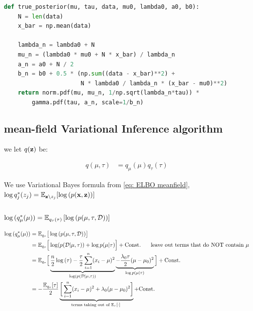 \documentclass{article}
\def\C{\text{Const.}}
\begin{document}
\begin{lstlisting}[language=Python]
def true_posterior(mu, tau, data, mu0, lambda0, a0, b0):
    N = len(data)
    x_bar = np.mean(data)
    
    lambda_n = lambda0 + N
    mu_n = (lambda0 * mu0 + N * x_bar) / lambda_n
    a_n = a0 + N / 2
    b_n = b0 + 0.5 * (np.sum((data - x_bar)**2) + 
                      N * lambda0 / lambda_n * (x_bar - mu0)**2)
    return norm.pdf(mu, mu_n, 1/np.sqrt(lambda_n*tau)) * 
		gamma.pdf(tau, a_n, scale=1/b_n)
\end{lstlisting}



\subsection{mean-field Variational Inference algorithm}

we let $q({\mathbf z})$ be:

\begin{equation}\begin{split}
q (\mu, \tau) &= q_{\mu} (\mu) q_{\tau}(\tau)
\end{split}\end{equation}

We use Variational Bayes formula from \ref{eq: ELBO meanfield}, $\log q_j^*(z_j) = \mathbb{E}_{{\mathbf z} \setminus z_j} [ \log{(p({\mathbf x},{\mathbf z}))} ]$

\subsubsection{$\log{ ( q_\mu^*(\mu)) } = \mathbb{E}_{q_\tau(\tau)}  \left[ \log{(p(\mu, \tau , \mathcal{D}))} \right]$}

\begin{equation}\begin{split}\label{eq log q mu}
    \log{ ( q_\mu^*(\mu)) } &= \E_{q_\tau}  \big[ \log{(p(\mu, \tau , \mathcal{D}))} \big]\\
&= \E_{q_\tau}  \Big[ \log ( p ( \mathcal{D}| \mu, \tau ) ) +  \log p (\mu | \tau) \Big] + \C \hspace{5 mm} \text{ leave out terms that do NOT contain } \mu \\
&= \E_{q_\tau}  \Big[ \underbrace{ \frac{n}{2 }  \log \left( \tau \right) - \frac{\tau}{2} \sum_{i=1}^n (x_i - \mu)^2 }_{\log ( p ( \mathcal{D}| \mu, \tau ) )} \underbrace{ -  \frac{\lambda_0 \tau}{2} (\mu - \mu_0)^2}_{\log p (\mu | \tau) }    \Big] + \C \\
&= -  \frac{\E_{q_\tau }[ \tau] }{2}  \underbrace{\bigg[  \sum_{i=1}^n (x_i - \mu)^2  +  \lambda_0 (\mu - \mu_0)^2  \bigg]}_{\text{terms taking out of $\E_{\tau}[\cdot]$ }} + \C \\
\end{split}\end{equation}
\end{document}
